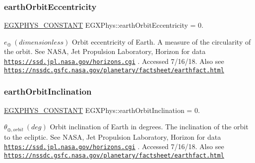 \subsubsection{\texorpdfstring{earth\+Orbit\+Eccentricity}{earthOrbitEccentricity}}
{\footnotesize\ttfamily \mbox{\hyperlink{group___e_g_x_phys-_constants-_macros_ga76980d288494ce1714c9ac68a95ba702}{E\+G\+X\+P\+H\+Y\+S\+\_\+\+C\+O\+N\+S\+T\+A\+NT}} E\+G\+X\+Phys\+::earth\+Orbit\+Eccentricity = 0.}

$ e_{\oplus} \ (dimensionless)$ Orbit eccentricity of Earth. A measure of the circularity of the orbit. See N\+A\+SA, Jet Propulsion Laboratory, Horizon for data \href{https://ssd.jpl.nasa.gov/horizons.cgi}{\tt https\+://ssd.\+jpl.\+nasa.\+gov/horizons.\+cgi} . Accessed 7/16/18. Also see \href{https://nssdc.gsfc.nasa.gov/planetary/factsheet/earthfact.html}{\tt https\+://nssdc.\+gsfc.\+nasa.\+gov/planetary/factsheet/earthfact.\+html} \mbox{\label{group___e_g_x_phys-_constants-_astrophysics-_solar_system-_earth-_orbit_ga077f2f59673907855b0aa50123a32265}} 
\subsubsection{\texorpdfstring{earth\+Orbit\+Inclination}{earthOrbitInclination}}
{\footnotesize\ttfamily \mbox{\hyperlink{group___e_g_x_phys-_constants-_macros_ga76980d288494ce1714c9ac68a95ba702}{E\+G\+X\+P\+H\+Y\+S\+\_\+\+C\+O\+N\+S\+T\+A\+NT}} E\+G\+X\+Phys\+::earth\+Orbit\+Inclination = 0.}

$ \theta_{\oplus,orbit} \ (deg)$ Orbit inclination of Earth in degrees. The inclination of the orbit to the ecliptic. See N\+A\+SA, Jet Propulsion Laboratory, Horizon for data \href{https://ssd.jpl.nasa.gov/horizons.cgi}{\tt https\+://ssd.\+jpl.\+nasa.\+gov/horizons.\+cgi} . Accessed 7/16/18. Also see \href{https://nssdc.gsfc.nasa.gov/planetary/factsheet/earthfact.html}{\tt https\+://nssdc.\+gsfc.\+nasa.\+gov/planetary/factsheet/earthfact.\+html} \mbox{\label{group___e_g_x_phys-_constants-_astrophysics-_solar_system-_earth-_orbit_gaae650e3a5c8214f5cae21a3eba1f1593}} 
